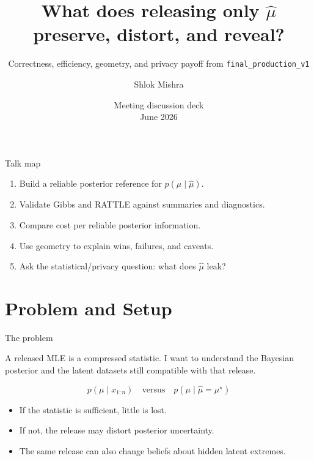 \documentclass[11pt,aspectratio=169]{beamer}
\title[MLE-only posterior analysis]{What does releasing only \texorpdfstring{$\hat{\mu}$}{mu-hat} preserve, distort, and reveal?}
\subtitle{Correctness, efficiency, geometry, and privacy payoff from \texttt{final\_production\_v1}}
\author[Shlok Mishra]{Shlok Mishra}
\institute[CEREMADE]{CEREMADE Lab}
\date[June 2026]{Meeting discussion deck \\ June 2026}
\newcommand{\claim}[1]{\begin{block}{}\large #1\end{block}}
\begin{document}
\begin{frame}
  \titlepage
\end{frame}

\begin{frame}{Talk map}
  \begin{enumerate}
    \item Build a reliable posterior reference for $p(\mu \mid \hat{\mu})$.
    \item Validate Gibbs and RATTLE against summaries and diagnostics.
    \item Compare cost per reliable posterior information.
    \item Use geometry to explain wins, failures, and caveats.
    \item Ask the statistical/privacy question: what does $\hat{\mu}$ leak?
  \end{enumerate}
\end{frame}

\section{Problem and Setup}

\begin{frame}{The problem}
  \claim{A released MLE is a compressed statistic. I want to understand the Bayesian posterior and the latent datasets still compatible with that release.}
  \[
    p(\mu \mid x_{1:n}) \quad \text{versus} \quad p(\mu \mid \hat{\mu}=\mu^\star)
  \]
  \begin{itemize}
    \item If the statistic is sufficient, little is lost.
    \item If not, the release may distort posterior uncertainty.
    \item The same release can also change beliefs about hidden latent extremes.
  \end{itemize}
\end{frame}
\end{document}
